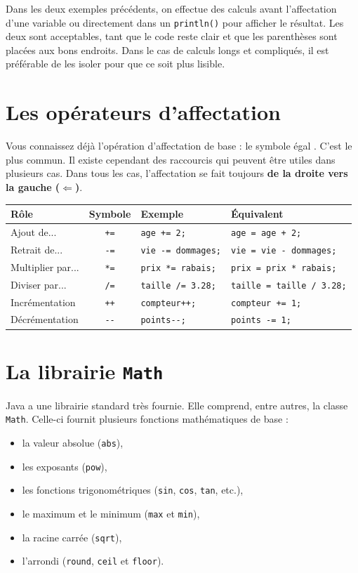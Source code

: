 \documentclass[12pt]{report}
\newcommand{\commande}[1]{%
\tcbox[on line, size=fbox, colframe=black, boxrule=0.75pt, tcbox raise base]{#1} %
}
\begin{document}
Dans les deux exemples précédents, on effectue des calculs avant l'affectation d'une variable ou directement dans un \texttt{println()} pour afficher le résultat. Les deux sont acceptables, tant que le code reste clair et que les parenthèses sont placées aux bons endroits. Dans le cas de calculs longs et compliqués, il est préférable de les isoler pour que ce soit plus lisible.

\section{Les opérateurs d'affectation}
Vous connaissez déjà l'opération d'affectation de base : le symbole égal \commande{=}. C'est le plus commun. Il existe cependant des raccourcis qui peuvent être utiles dans plusieurs cas. Dans tous les cas, l'affectation se fait toujours \textbf{de la droite vers la gauche ($\boldsymbol{\Leftarrow}$)}.

\begin{center}
\renewcommand{\arraystretch}{1.5}
	\begin{tabularx}{\linewidth}{l c X X} \toprule
		\textbf{Rôle} & \textbf{Symbole} & \textbf{Exemple} & \textbf{Équivalent} \\ \midrule
		Ajout de... & \texttt{+=} & \texttt{age += 2;} & \texttt{age = age + 2;} \\
		Retrait de... & \texttt{-=} & \texttt{vie -= dommages;} & \texttt{vie = vie - dommages;} \\
		Multiplier par... & \texttt{*=} & \texttt{prix *= rabais;} & \texttt{prix = prix * rabais;} \\
		Diviser par... & \texttt{/=} & \texttt{taille /= 3.28;} & \texttt{taille = taille / 3.28;} \\
		Incrémentation & \texttt{++} & \texttt{compteur++;} & \texttt{compteur += 1;} \\
		Décrémentation & \texttt{-{}-} & \texttt{points-{}-;} & \texttt{points -= 1;} \\ \bottomrule
	\end{tabularx}
\end{center}


\section{La librairie \texttt{Math}} \label{lib-math}
Java a une librairie standard très fournie. Elle comprend, entre autres, la classe \texttt{Math}. Celle-ci fournit plusieurs fonctions mathématiques de base : 
\begin{itemize}
	\item la valeur absolue (\texttt{abs}),
	\item les exposants (\texttt{pow}),
	\item les fonctions trigonométriques (\texttt{sin}, \texttt{cos}, \texttt{tan}, etc.),
	\item le maximum et le minimum (\texttt{max} et \texttt{min}),
	\item la racine carrée (\texttt{sqrt}),
	\item l'arrondi (\texttt{round}, \texttt{ceil} et \texttt{floor}).
\end{itemize}
\end{document}
